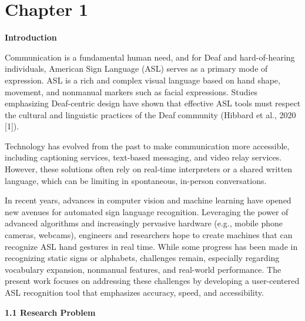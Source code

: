 \documentclass[12pt]{article}
\begin{document}
\clearpage
{}
\setcounter{page}{1}
\doublespacing

\newpage
\tableofcontents
\newpage

\listoffigures
\newpage

\doublespacing

\newpage
\section*{Chapter 1}
\begin{center}
\large \textbf{Introduction}
\end{center}

Communication is a fundamental human need, and for Deaf and hard-of-hearing individuals, 
American Sign Language (ASL) serves as a primary mode of expression. ASL is a rich and 
complex visual language based on hand shape, movement, and nonmanual markers such as facial 
expressions. Studies emphasizing Deaf-centric design have shown that effective ASL tools must 
respect the cultural and linguistic practices of the Deaf community (Hibbard et al., 2020 [1]).

Technology has evolved from the past to make communication more accessible, including captioning 
services, text-based messaging, and video relay services. However, these solutions often rely on 
real-time interpreters or a shared written language, which can be limiting in spontaneous, in-person 
conversations.

In recent years, advances in computer vision and machine learning have opened new avenues for 
automated sign language recognition. Leveraging the power of advanced algorithms and increasingly 
pervasive hardware (e.g., mobile phone cameras, webcams), engineers and researchers hope to create 
machines that can recognize ASL hand gestures in real time. While some progress has been made in 
recognizing static signs or alphabets, challenges remain, especially regarding vocabulary expansion, 
nonmanual features, and real-world performance. The present work focuses on addressing these 
challenges by developing a user-centered ASL recognition tool that emphasizes accuracy, speed, 
and accessibility.

\vspace{1.5em}
\noindent
\textbf{1.1 Research Problem}
\vspace{1.5em}
\end{document}
